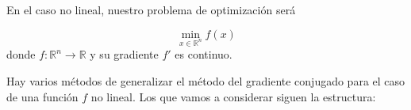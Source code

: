 %
%
%
%

En el caso no lineal, nuestro problema de optimización será

\begin{equation}\label{min-f}
	\min_{x \in \mathbb{R}^n} f(x)
\end{equation}
donde $f : \mathbb{R}^n \to \mathbb{R}$ y su gradiente $f'$ es continuo.

Hay varios métodos de generalizar el método del gradiente conjugado para el caso de una función $f$ no lineal. Los que vamos a considerar siguen la estructura:

